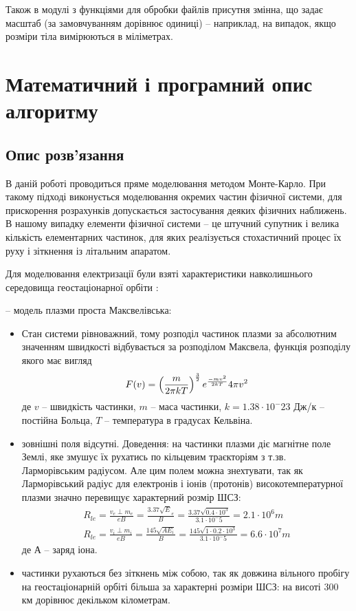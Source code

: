 \documentclass[a4paper,12pt]{article}
\begin{document}
\bigskip

Також в модулі з функціями для обробки файлів присутня змінна, що задає масштаб (за замовчуванням дорівнює одиниці) -- наприклад, на випадок, якщо розміри тіла вимірюються в міліметрах.

\newpage

\section{Математичний і програмний опис алгоритму}
\subsection{Опис розв’язання}
В даній роботі проводиться пряме моделювання методом Монте-Карло. При такому підході виконується моделювання окремих частин фізичної системи, для прискорення розрахунків допускається застосування деяких фізичних наближень. В нашому випадку елементи фізичної системи -- це штучний супутник і велика кількість елементарних частинок, для яких реалізується стохастичний процес їх руху і зіткнення із літальним апаратом.

Для моделювання електризації були взяті характеристики навколишнього середовища геостаціонарної орбіти \cite{novikov}:

-- модель плазми проста Максвелівська:
\renewcommand{\labelitemi}{$\circ$}
\begin{itemize}
 \item Стан системи рівноважний, тому розподіл частинок плазми за абсолютним значенням швидкості відбувається за розподілом Максвела, функція розподілу якого має вигляд
\[
  F(v) = \left(\frac{m}{2 \pi k T}\right)^{3 \over 2} e^\frac{-mv^2}{2 k T} 4 \pi v^2
\]
 де $v$ -- швидкість частинки, $m$ -- маса частинки, $k = 1.38 \cdot 10^-23$ Дж/к -- постійна Больца, $T$ -- температура в градусах Кельвіна.
 \item зовнішні поля відсутні. Доведення: на частинки плазми діє магнітне поле Землі, яке змушує їх рухатись по кільцевим траєкторіям з т.зв. Ларморівським радіусом. Але цим полем можна знехтувати, так як Ларморівський радіус для електронів і іонів (протонів) високотемпературної плазми значно перевищує характерний розмір ШСЗ:
\begin{eqnarray}
 R_{le} = \frac{v_e \perp m_e}{eB} = \frac{3.37 \sqrt E_e}{B} = \frac{3.37 \sqrt {0.4 \cdot 10^3}}{3.1 \cdot 10^-5} = 2.1 \cdot 10^6 m \\
 R_{le} = \frac{v_i \perp m_i}{eB} = \frac{145 \sqrt {A E_i}}{B} = \frac{145 \sqrt {1 \cdot 0.2 \cdot 10^3}}{3.1 \cdot 10^-5} = 6.6 \cdot 10^7 m
\end{eqnarray}
де А -- заряд іона.
\item частинки рухаються без зіткнень між собою, так як довжина вільного пробігу на геостаціонарній орбіті більша за характерні розміри ШСЗ: на висоті 300 км дорівнює декільком кілометрам.
\end{itemize}
\end{document}
